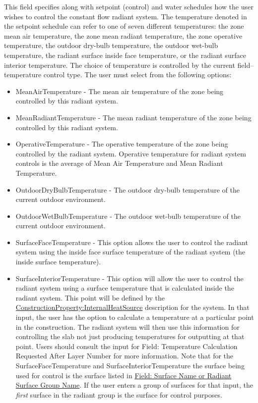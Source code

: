 This field specifies along with setpoint (control) and water schedules how the user wishes to control the constant flow radiant system. The temperature denoted in the setpoint schedule can refer to one of seven different temperatures: the zone mean air temperature, the zone mean radiant temperature, the zone operative temperature, the outdoor dry-bulb temperature, the outdoor wet-bulb temperature, the radiant surface inside face temperature, or the radiant surface interior temperature. The choice of temperature is controlled by the current field--temperature control type. The user must select from the following options:

\begin{itemize}
\item
  MeanAirTemperature - The mean air temperature of the zone being controlled by this radiant system.
\item
  MeanRadiantTemperature - The mean radiant temperature of the zone being controlled by this radiant system.
\item
  OperativeTemperature - The operative temperature of the zone being controlled by the radiant system. Operative temperature for radiant system controls is the average of Mean Air Temperature and Mean Radiant Temperature.
\item
  OutdoorDryBulbTemperature - The outdoor dry-bulb temperature of the current outdoor environment.
\item
  OutdoorWetBulbTemperature - The outdoor wet-bulb temperature of the current outdoor environment.
\item
  SurfaceFaceTemperature - This option allows the user to control the radiant system using the inside face surface temperature of the radiant system (the inside surface temperature).
\item SurfaceInteriorTemperature - This option will allow the user to control
      the radiant system using a surface temperature that is calculated inside
      the radiant system.  This point will be defined by the
      \hyperref[constructioninternalsource]{ConstructionProperty:InternalHeatSource}
      description for the system.  In that input, the user has the option to
      calculate a temperature at a particular point in the construction.  The
      radiant system will then use this information for controlling the slab
      not just producing temperatures for outputting at that point.  Users
      should consult the input for Field: Temperature Calculation Requested
      After Layer Number for more information.  Note that for the
      SurfaceFaceTemperature and SurfaceInteriorTemperature the surface being
      used for control is the surface listed in \hyperref[field-surface-name-or-radiant-surface-group-name-2]{Field: Surface Name or Radiant Surface Group Name}.  If the user enters a group of surfaces for that input, the
      \emph{first} surface in the radiant group is the surface for control
      purposes.
\end{itemize}

